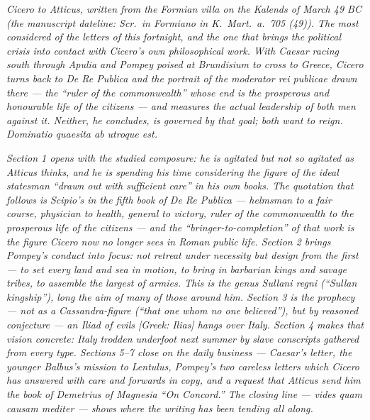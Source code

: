 
\textit{Cicero to Atticus, written from the Formian
villa on the Kalends of March 49 BC (the manuscript
dateline: \textit{Scr.\ in Formiano in K.\ Mart.\ a.\
705 (49)}). The most considered of the letters of this
fortnight, and the one that brings the political crisis
into contact with Cicero's own philosophical work. With
Caesar racing south through Apulia and Pompey poised at
Brundisium to cross to Greece, Cicero turns back to
\textit{De Re Publica} and the portrait of the
\textit{moderator rei publicae} drawn there --- the
``ruler of the commonwealth'' whose end is the
prosperous and honourable life of the citizens --- and
measures the actual leadership of both men against it.
Neither, he concludes, is governed by that goal; both
want to reign. \textit{Dominatio quaesita ab utroque
est}.}

\textit{Section 1 opens with the studied composure: he
is agitated but not so agitated as Atticus thinks, and
he is spending his time considering the figure of the
ideal statesman ``drawn out with sufficient care'' in
his own books. The quotation that follows is Scipio's
in the fifth book of \textit{De Re Publica} --- helmsman
to a fair course, physician to health, general to
victory, ruler of the commonwealth to the prosperous
life of the citizens --- and the ``bringer-to-completion''
of that work is the figure Cicero now no longer sees in
Roman public life. Section 2 brings Pompey's conduct
into focus: not retreat under necessity but design from
the first --- to set every land and sea in motion, to
bring in barbarian kings and savage tribes, to assemble
the largest of armies. This is the \textit{genus
Sullani regni} (``Sullan kingship''), long the aim of
many of those around him. Section 3 is the prophecy ---
not as a Cassandra-figure (``that one whom no one
believed''), but by reasoned conjecture --- an Iliad of
evils \textit{[Greek: Ilias]} hangs over Italy. Section
4 makes that vision concrete: Italy trodden underfoot
next summer by slave conscripts gathered from every
type. Sections 5--7 close on the daily business ---
Caesar's letter, the younger Balbus's mission to
Lentulus, Pompey's two careless letters which Cicero
has answered with care and forwards in copy, and a
request that Atticus send him the book of Demetrius of
Magnesia ``On Concord.'' The closing line --- \textit{vides
quam causam mediter} --- shows where the writing has
been tending all along.}
